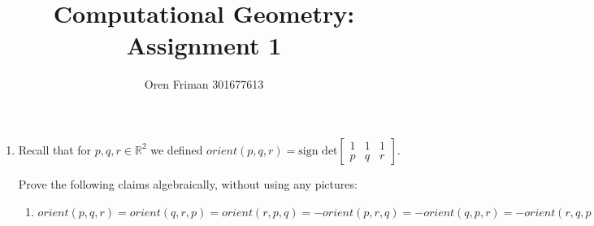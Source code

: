 \documentclass[a4paper, 8pt, oneside]{article}
\newcommand{\R}{\mathbb{R}}
\begin{document}
\title{Computational Geometry: Assignment 1}
\author{Oren Friman 301677613}
\maketitle

\medskip

\begin{enumerate}
\item
 Recall that for $p, q, r \in \R^2$ we defined $orient(p,q,r) = \text{sign det}
\begin{bmatrix}
    1 &1 & 1 \\
    p &q & r
\end{bmatrix}$.

Prove the following claims algebraically, without using any pictures:
 \begin{enumerate}
\item  $orient(p,q,r) = orient(q,r,p) = orient(r,p,q) = -orient(p,r,q) = -orient(q,p,r) = -orient(r,q,p)$


\end{enumerate}
\end{enumerate}
\end{document}
